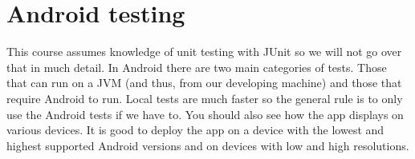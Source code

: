 \graphicspath{{./lab06/Images/}}


\maketocpage

\section{Android testing}
This course assumes knowledge of unit testing with JUnit so we will not go over that in much detail. In Android there are two main categories of tests. Those that can run on a JVM (and thus, from our developing machine) and those that require Android to run. Local tests are much faster so the general rule is to only use the Android tests if we have to. You should also see how the app displays on various devices. It is good to deploy the app on a device with the lowest and highest supported Android versions and on devices with low and high resolutions.\\

